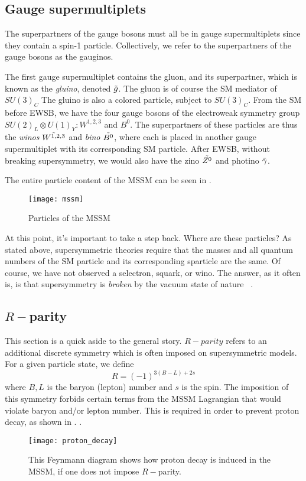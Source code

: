 \subsection{Gauge supermultiplets}

The superpartners of the gauge bosons must all be in gauge supermultiplets since they contain a spin-1 particle.
Collectively, we refer to the superpartners of the gauge bosons as the gauginos.

The first gauge supermultiplet contains the gluon, and its superpartner, which is known as the \textit{gluino}, denoted $\tilde{g}$.
The gluon is of course the SM mediator of $SU(3)_C$
The gluino is also a colored particle, subject to $SU(3)_C$.
From the SM before EWSB, we have the four gauge bosons of the electroweak symmetry group $SU(2)_L \otimes U(1)_Y : W^{1,2,3}$ and $B^0$.
The superpartners of these particles are thus the \textit{winos} $\tilde{W^{1,2,3}}$ and \textit{bino} $\tilde{B^0}$, where each is placed in another gauge supermultiplet with its corresponding SM particle.
After EWSB, without breaking supersymmetry, we would also have the zino $\tilde{Z^0}$ and photino $\tilde{\gamma}$.

The entire particle content of the MSSM can be seen in .
\begin{figure}
\caption{Particles of the MSSM} \label{fig:mssm}
\texttt{[image: mssm]}
\end{figure}

At this point, it's important to take a step back.
Where are these particles?
As stated above, supersymmetric theories require that the masses and all quantum numbers of the SM particle and its corresponding sparticle are the same.
Of course, we have not observed a selectron, squark, or wino.
The answer, as it often is, is that supersymmetry is \textit{broken} by the vacuum state of nature ~\cite{susyPrimer}.

\subsection{$R-$parity}\label{sec:r_parity}

This section is a quick aside to the general story.
$R-parity$ refers to an additional discrete symmetry which is often imposed on supersymmetric models.
For a given particle state, we define
\begin{equation}
R = (-1)^{3(B-L) + 2s}
\end{equation}
where $B,L$ is the baryon (lepton) number and $s$ is the spin.
The imposition of this symmetry forbids certain terms from the MSSM Lagrangian that would violate baryon and/or lepton number.
This is required in order to prevent proton decay, as shown in \footnotemark.
.
\begin{figure}
\caption{This Feynmann diagram shows how proton decay is induced in the MSSM, if one does not impose $R-$parity.}\label{fig:proton_decay}
\texttt{[image: proton\_decay]}
\end{figure}

